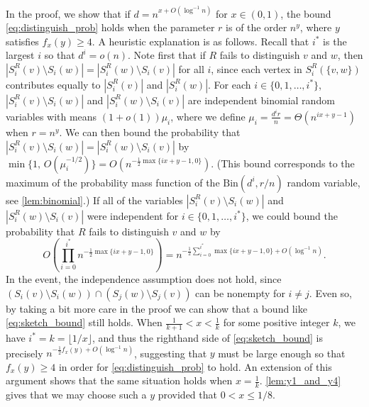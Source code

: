 \documentclass[12pt]{article}
\theoremstyle{definition}
\theoremstyle{remark}
\theoremstyle{remark}
\numberwithin{theorem}{section}
\begin{document}
In the proof, we show that if $d = n^{x + O(\log^{-1}n)}$ for $x \in (0,1)$, the bound \eqref{eq:distinguish_prob} holds when the parameter $r$ is of the order $n^{y}$, where $y$ satisfies $f_{x}(y) \geq 4$. A heuristic explanation is as follows. Recall that $i^{*}$ is the largest $i$ so that $d^{i} = o(n)$. Note first that if $R$ fails to distinguish $v$ and $w$, then $|S_{i}^{R}(v) \setminus S_{i}(w)| = |S_{i}^{R}(w) \setminus S_{i}(v)|$ for all $i$, since each vertex in $S_{i}^{R}(\{v,w\})$ contributes equally to $|S_{i}^{R}(v)|$ and $|S_{i}^{R}(w)|$. For each $i \in \{ 0,1,\dots,i^{*} \} $, $|S_{i}^{R}(v) \setminus S_{i}(w)|$ and $|S_{i}^{R}(w) \setminus S_{i}(v)|$ are independent binomial random variables with means $(1+o(1))\mu_{i}$, where we define $\mu_{i} = \frac{d^{i}r}{n} = \Theta(n^{ix+y -1})$ when $r = n^{y}$. We can then bound the probability that $|S_{i}^{R}(v) \setminus S_{i}(w)| = |S_{i}^{R}(w) \setminus S_{i}(v)|$ by $\min\{1,\,O(\mu_{i}^{-1/2})\} = O\left(n^{-\frac{1}{2}\max\{ix+y-1,0\}} \right)$. (This bound corresponds to the maximum of the probability mass function of the $\text{Bin}(d^{i}, r/n)$ random variable, see \cref{lem:binomial}.) If all of the variables $|S_{i}^{R}(v) \setminus S_{i}(w)|$ and $|S_{i}^{R}(w)\setminus S_{i}(v)|$ were independent for $i \in \{ 0,1,\dots,i^{*} \} $, we could bound the probability that $R$ fails to distinguish $v$ and $w$ by 
\begin{equation}\label{eq:sketch_bound}
	O\left(\prod_{i=0}^{i^{*}}n^{-\frac{1}{2}\max\{ix+y-1,0\}} \right) = n^{-\frac{1}{2}\sum_{i=0}^{i^{*}}\max\{ix+y-1,0\} + O(\log^{-1}n)}.
\end{equation}
In the event, the independence assumption does not hold, since $(S_{i}(v) \setminus S_{i}(w)) \cap (S_{j}(w) \setminus S_{j}(v))$ can be nonempty for $i \neq j$. Even so, by taking a bit more care in the proof we can show that a bound like \eqref{eq:sketch_bound} still holds. When $\frac{1}{k+1} < x < \frac{1}{k}$ for some positive integer $k$, we have $i^{*} = k = \lfloor 1/x \rfloor$, and thus the righthand side of \eqref{eq:sketch_bound} is precisely $n^{-\frac{1}{2}f_{x}(y) + O(\log^{-1}n)}$, suggesting that $y$ must be large enough so that $f_{x}(y) \geq 4$ in order for \eqref{eq:distinguish_prob} to hold. An extension of this argument shows that the same situation holds when $x = \frac{1}{k}$. \cref{lem:y1_and_y4} gives that we may choose such a $y$ provided that $0  < x \leq 1/8$. 
\end{document}
